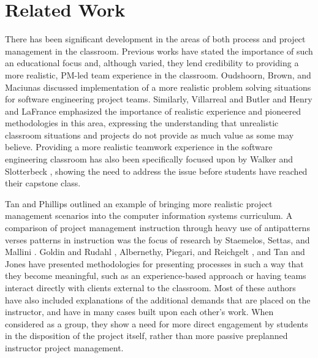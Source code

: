 \documentclass{sig-alternate}
\begin{document}
\section{Related Work}
\label{sec:related}
There has been significant development in the areas of both process and project management in the
classroom. Previous works have stated the importance of such an educational focus and, although varied, 
they lend credibility to providing a more realistic, PM-led team experience in the classroom. Oudshoorn, Brown, 
and Maciunas \cite{533976} discussed implementation of a more
realistic problem solving situations for software engineering project teams. Similarly, Villarreal and
Butler \cite{Villarreal:1998:GCS:274790.273157} and Henry and LaFrance \cite{Henry:2006:IRS:1181901.1181908} 
emphasized the importance of realistic experience and pioneered methodologies in this
area, expressing the understanding that unrealistic classroom situations and projects do not provide as
much value as some may believe. Providing a more realistic teamwork experience in the software
engineering classroom has also been specifically focused upon by Walker and Slotterbeck \cite{Walker:2002:IRT:775742.775765},
showing the need to address the issue before students have reached their capstone class.

Tan and Phillips \cite{Tan:2005:RPM:1059888.1059947} outlined an example of bringing more realistic project management scenarios
into the computer information systems curriculum. A comparison of project management instruction
through heavy use of antipatterns verses patterns in instruction was the focus of research by Staemelos,
Settas, and Mallini \cite{6065055}. Goldin and Rudahl \cite{5341212}, Albernethy, Piegari, and Reichgelt \cite{Abernethy:2007:TPM:1181849.1181888}, and
Tan and Jones \cite{Tan:2008:CSC:1352627.1352651} have presented methodologies for presenting processes in such a way that they
become meaningful, such as an experience-based approach or having teams interact directly with clients
external to the classroom. Most of these authors have also included explanations of the additional
demands that are placed on the instructor, and have in many cases built upon each other's work. When considered 
as a group, they show a need for more direct engagement by students in the disposition of the project itself, 
rather than more passive preplanned instructor project management.
\end{document}
